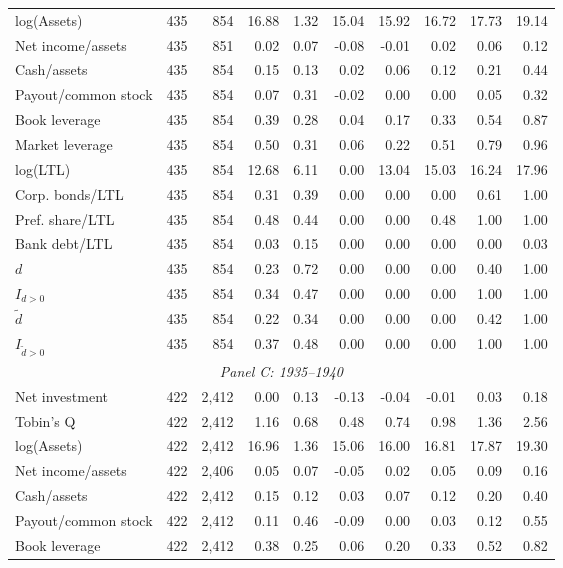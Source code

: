 \begin{threeparttable}
\begin{tabular}{lrrrrrrrrr}
log(Assets) & 435 & 854 & 16.88 & 1.32 & 15.04 & 15.92 & 16.72 & 17.73 & 19.14 \\
Net income/assets & 435 & 851 & 0.02 & 0.07 & -0.08 & -0.01 & 0.02 & 0.06 & 0.12 \\
Cash/assets & 435 & 854 & 0.15 & 0.13 & 0.02 & 0.06 & 0.12 & 0.21 & 0.44 \\
Payout/common stock & 435 & 854 & 0.07 & 0.31 & -0.02 & 0.00 & 0.00 & 0.05 & 0.32 \\
Book leverage & 435 & 854 & 0.39 & 0.28 & 0.04 & 0.17 & 0.33 & 0.54 & 0.87 \\
Market leverage & 435 & 854 & 0.50 & 0.31 & 0.06 & 0.22 & 0.51 & 0.79 & 0.96 \\
log(LTL) & 435 & 854 & 12.68 & 6.11 & 0.00 & 13.04 & 15.03 & 16.24 & 17.96 \\
Corp. bonds/LTL & 435 & 854 & 0.31 & 0.39 & 0.00 & 0.00 & 0.00 & 0.61 & 1.00 \\
Pref. share/LTL & 435 & 854 & 0.48 & 0.44 & 0.00 & 0.00 & 0.48 & 1.00 & 1.00 \\
Bank debt/LTL & 435 & 854 & 0.03 & 0.15 & 0.00 & 0.00 & 0.00 & 0.00 & 0.03 \\
\ensuremath{d} & 435 & 854 & 0.23 & 0.72 & 0.00 & 0.00 & 0.00 & 0.40 & 1.00 \\
\ensuremath{I_{d>0}} & 435 & 854 & 0.34 & 0.47 & 0.00 & 0.00 & 0.00 & 1.00 & 1.00 \\
\ensuremath{\tilde{d}} & 435 & 854 & 0.22 & 0.34 & 0.00 & 0.00 & 0.00 & 0.42 & 1.00 \\
\ensuremath{I_{\tilde{d}>0}} & 435 & 854 & 0.37 & 0.48 & 0.00 & 0.00 & 0.00 & 1.00 & 1.00 \\
\midrule
\multicolumn{10}{c}{\textit{Panel C: 1935--1940}} \\
\midrule
Net investment & 422 & 2,412 & 0.00 & 0.13 & -0.13 & -0.04 & -0.01 & 0.03 & 0.18 \\
Tobin's Q & 422 & 2,412 & 1.16 & 0.68 & 0.48 & 0.74 & 0.98 & 1.36 & 2.56 \\
log(Assets) & 422 & 2,412 & 16.96 & 1.36 & 15.06 & 16.00 & 16.81 & 17.87 & 19.30 \\
Net income/assets & 422 & 2,406 & 0.05 & 0.07 & -0.05 & 0.02 & 0.05 & 0.09 & 0.16 \\
Cash/assets & 422 & 2,412 & 0.15 & 0.12 & 0.03 & 0.07 & 0.12 & 0.20 & 0.40 \\
Payout/common stock & 422 & 2,412 & 0.11 & 0.46 & -0.09 & 0.00 & 0.03 & 0.12 & 0.55 \\
Book leverage & 422 & 2,412 & 0.38 & 0.25 & 0.06 & 0.20 & 0.33 & 0.52 & 0.82 \\

\end{tabular}
\end{threeparttable}
